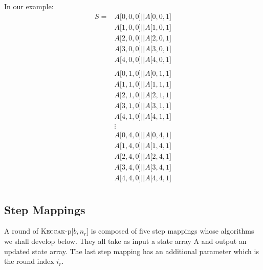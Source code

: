 In our example:
\begin{equation}
\begin{aligned}
S = & A\lbrack 0, 0, 0\rbrack \vert \vert A\lbrack 0, 0, 1\rbrack \\
    & A\lbrack 1, 0, 0\rbrack \vert \vert A\lbrack 1, 0, 1\rbrack \\
    & A\lbrack 2, 0, 0\rbrack \vert \vert A\lbrack 2, 0, 1\rbrack \\
    & A\lbrack 3, 0, 0\rbrack \vert \vert A\lbrack 3, 0, 1\rbrack \\
    & A\lbrack 4, 0, 0\rbrack \vert \vert A\lbrack 4, 0, 1\rbrack \\
    & \\
    & A\lbrack 0, 1, 0\rbrack \vert \vert A\lbrack 0, 1, 1\rbrack \\
    & A\lbrack 1, 1, 0\rbrack \vert \vert A\lbrack 1, 1, 1\rbrack \\
    & A\lbrack 2, 1, 0\rbrack \vert \vert A\lbrack 2, 1, 1\rbrack \\
    & A\lbrack 3, 1, 0\rbrack \vert \vert A\lbrack 3, 1, 1\rbrack \\
    & A\lbrack 4, 1, 0\rbrack \vert \vert A\lbrack 4, 1, 1\rbrack \\
    & \vdots \\
    & A\lbrack 0, 4, 0\rbrack \vert \vert A\lbrack 0, 4, 1\rbrack \\
    & A\lbrack 1, 4, 0\rbrack \vert \vert A\lbrack 1, 4, 1\rbrack \\
    & A\lbrack 2, 4, 0\rbrack \vert \vert A\lbrack 2, 4, 1\rbrack \\
    & A\lbrack 3, 4, 0\rbrack \vert \vert A\lbrack 3, 4, 1\rbrack \\
    & A\lbrack 4, 4, 0\rbrack \vert \vert A\lbrack 4, 4, 1\rbrack \\
\end{aligned}
\end{equation}

\subsection{Step Mappings}
A round of \textsc{Keccak}-p$\lbrack b, n_r \rbrack$ is composed of five step mappings whose algorithms we shall develop below. They all take as input a state array A and output an updated state array. The last step mapping has an additional parameter which is the round index $i_r$.

